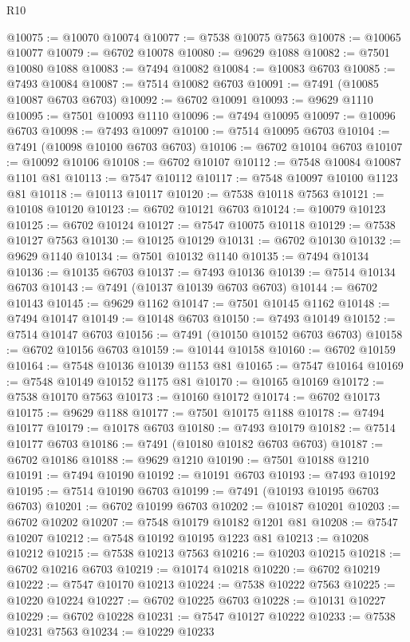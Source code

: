 \begin{lexlean}{R10}
\begin{coremodule}
@10075 := @10070 @10074
@10077 := @7538 @10075 @7563
@10078 := @10065 @10077
@10079 := @6702 @10078
@10080 := @9629 @1088
@10082 := @7501 @10080 @1088
@10083 := @7494 @10082
@10084 := @10083 @6703
@10085 := @7493 @10084
@10087 := @7514 @10082 @6703
@10091 := @7491 (@10085 @10087 @6703 @6703)
@10092 := @6702 @10091
@10093 := @9629 @1110
@10095 := @7501 @10093 @1110
@10096 := @7494 @10095
@10097 := @10096 @6703
@10098 := @7493 @10097
@10100 := @7514 @10095 @6703
@10104 := @7491 (@10098 @10100 @6703 @6703)
@10106 := @6702 @10104 @6703
@10107 := @10092 @10106
@10108 := @6702 @10107
@10112 := @7548 @10084 @10087 @1101 @81
@10113 := @7547 @10112
@10117 := @7548 @10097 @10100 @1123 @81
@10118 := @10113 @10117
@10120 := @7538 @10118 @7563
@10121 := @10108 @10120
@10123 := @6702 @10121 @6703
@10124 := @10079 @10123
@10125 := @6702 @10124
@10127 := @7547 @10075 @10118
@10129 := @7538 @10127 @7563
@10130 := @10125 @10129
@10131 := @6702 @10130
@10132 := @9629 @1140
@10134 := @7501 @10132 @1140
@10135 := @7494 @10134
@10136 := @10135 @6703
@10137 := @7493 @10136
@10139 := @7514 @10134 @6703
@10143 := @7491 (@10137 @10139 @6703 @6703)
@10144 := @6702 @10143
@10145 := @9629 @1162
@10147 := @7501 @10145 @1162
@10148 := @7494 @10147
@10149 := @10148 @6703
@10150 := @7493 @10149
@10152 := @7514 @10147 @6703
@10156 := @7491 (@10150 @10152 @6703 @6703)
@10158 := @6702 @10156 @6703
@10159 := @10144 @10158
@10160 := @6702 @10159
@10164 := @7548 @10136 @10139 @1153 @81
@10165 := @7547 @10164
@10169 := @7548 @10149 @10152 @1175 @81
@10170 := @10165 @10169
@10172 := @7538 @10170 @7563
@10173 := @10160 @10172
@10174 := @6702 @10173
@10175 := @9629 @1188
@10177 := @7501 @10175 @1188
@10178 := @7494 @10177
@10179 := @10178 @6703
@10180 := @7493 @10179
@10182 := @7514 @10177 @6703
@10186 := @7491 (@10180 @10182 @6703 @6703)
@10187 := @6702 @10186
@10188 := @9629 @1210
@10190 := @7501 @10188 @1210
@10191 := @7494 @10190
@10192 := @10191 @6703
@10193 := @7493 @10192
@10195 := @7514 @10190 @6703
@10199 := @7491 (@10193 @10195 @6703 @6703)
@10201 := @6702 @10199 @6703
@10202 := @10187 @10201
@10203 := @6702 @10202
@10207 := @7548 @10179 @10182 @1201 @81
@10208 := @7547 @10207
@10212 := @7548 @10192 @10195 @1223 @81
@10213 := @10208 @10212
@10215 := @7538 @10213 @7563
@10216 := @10203 @10215
@10218 := @6702 @10216 @6703
@10219 := @10174 @10218
@10220 := @6702 @10219
@10222 := @7547 @10170 @10213
@10224 := @7538 @10222 @7563
@10225 := @10220 @10224
@10227 := @6702 @10225 @6703
@10228 := @10131 @10227
@10229 := @6702 @10228
@10231 := @7547 @10127 @10222
@10233 := @7538 @10231 @7563
@10234 := @10229 @10233

\end{coremodule}
\end{lexlean}
